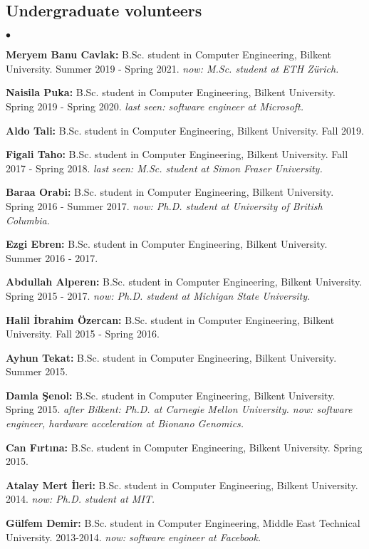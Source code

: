 \documentclass[margin,line]{res}
\newenvironment{list2}{
  \begin{list}{$\bullet$}{%
      \setlength{\itemsep}{0.1cm}
      \setlength{\parsep}{0in} \setlength{\parskip}{0in}
      \setlength{\topsep}{0in} \setlength{\partopsep}{0in} 
      \setlength{\leftmargin}{0.2in}}}{\end{list}}
\begin{document}
\begin{resume}
\subsection{\small \sc Undergraduate volunteers}
\begin{list2}
\item {\bf Meryem Banu Cavlak:} B.Sc. student in Computer Engineering,  Bilkent University. Summer 2019 - Spring 2021. {\it now: M.Sc. student at ETH Zürich.}
\item {\bf Naisila Puka:} B.Sc. student in Computer Engineering,  Bilkent University. Spring 2019 - Spring 2020. {\it last seen: software engineer at Microsoft.}
  \item {\bf Aldo Tali:} B.Sc. student in Computer Engineering,  Bilkent University. Fall 2019.
\item {\bf Figali Taho:} B.Sc. student in Computer Engineering,  Bilkent University. Fall 2017 - Spring 2018. {\it last seen: M.Sc. student at Simon Fraser University.}
\item {\bf Baraa Orabi:} B.Sc. student in Computer Engineering,  Bilkent University. Spring 2016 - Summer 2017. {\it now: Ph.D. student at  University of British Columbia.}
\item {\bf Ezgi Ebren:} B.Sc. student in Computer Engineering,  Bilkent University. Summer 2016 - 2017.
\item {\bf Abdullah Alperen:} B.Sc. student in Computer Engineering,  Bilkent University. Spring 2015 - 2017. {\it now: Ph.D. student at Michigan State University.}
\item {\bf Halil İbrahim Özercan:} B.Sc. student in Computer Engineering,  Bilkent University. Fall 2015 - Spring 2016. 
\item {\bf Ayhun Tekat:} B.Sc. student in Computer Engineering,  Bilkent University. Summer 2015. 
\item {\bf Damla Şenol:} B.Sc. student in Computer Engineering,  Bilkent University. Spring 2015. {\it after Bilkent: Ph.D. at Carnegie Mellon University. now: software engineer, hardware acceleration at Bionano Genomics.}
\item {\bf Can Fırtına:} B.Sc. student in Computer Engineering,  Bilkent University. Spring 2015. 
\item {\bf Atalay Mert İleri:} B.Sc. student in Computer Engineering, Bilkent University. 2014. {\it now: Ph.D. student at MIT.}
\item {\bf Gülfem Demir:} B.Sc. student in Computer Engineering,  Middle East Technical University. 2013-2014. {\it now: software engineer at Facebook.}


\end{list2}
\end{resume}
\end{document}
